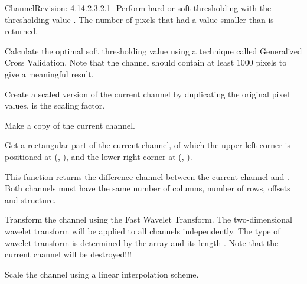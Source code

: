 \begin{manpage}{\libtitle}{Channel}{$ $Revision: 4.14.2.3.2.1 $ $}
    Perform hard or soft thresholding with the thresholding value
    . The number of pixels that had a value smaller than
     is returned.

    Calculate the optimal soft thresholding value using a technique called
    Generalized Cross Validation. Note that the channel should contain at least
    1000 pixels to give a meaningful result.

    Create a scaled version of the current channel by duplicating the
    original pixel values.  is the scaling factor.


\subtitle{Virtual \\ Operations}

    Make a copy of the current channel.

    Get a rectangular part of the current channel, of which the upper left
    corner is positioned at (, ), and the lower right corner
    at (, ).

    This function returns the difference channel between the current channel
    and . Both channels must have the same number of columns,
    number of rows, offsets and structure.

    Transform the channel using the Fast Wavelet Transform. The two-dimensional
    wavelet transform will be applied to all channels independently. The type
    of wavelet transform is determined by the  array and its
    length . Note that the current channel will be destroyed!!!


\subtitle{Protected \\ Operations}

    Scale the channel using a linear interpolation scheme.


\end{manpage}
